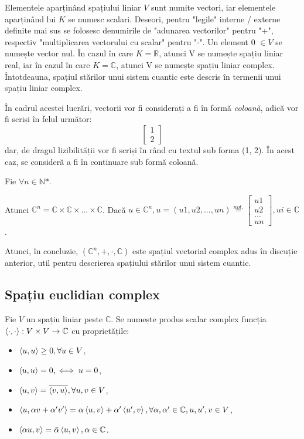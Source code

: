Elementele aparținând spațiului liniar $V$ sunt numite vectori, iar elementele aparținând lui $K$ se numesc scalari. Deseori, pentru "legile" interne / externe definite mai sus se folosesc denumirile de "adunarea vectorilor" pentru "+", respectiv "multiplicarea vectorului cu scalar" pentru "$\cdot$". Un element 0 $\in V$ se numește vector nul. În cazul în care $K = \mathbb{R}$, atunci V se numește spațiu liniar real, iar în cazul în care $K = \mathbb{C}$, atunci V se numește spațiu liniar complex. 
Întotdeauna, spațiul stărilor unui sistem cuantic este descris în termenii unui spațiu liniar complex.

În cadrul acestei lucrări, vectorii vor fi considerați a fi în formă \textit{coloană}, adică vor fi scriși în felul următor:
\[
\begin{bmatrix}
1 \\ 2
\end{bmatrix}
\]
dar, de dragul lizibilității vor fi scriși în rând cu textul sub forma (1, 2). În acest caz, se consideră a fi în continuare sub formă coloană.

Fie $\forall n \in \mathbb{N}\text{*}$.

Atunci $\mathbb{C}^n = \mathbb{C} \times \mathbb{C} \times ... \times \mathbb{C}$. Dacă $u \in \mathbb{C}^n, u=(u1, u2, ..., un) \overset{not.}{=} \begin{bmatrix}
u1 \\ u2 \\ ... \\ un
\end{bmatrix}, ui \in \mathbb{C}$.

Atunci, în concluzie, $(\mathbb{C}^n, +, \cdot, \mathbb{C})$ este spațiul vectorial complex adus în discuție anterior, util pentru descrierea spațiului stărilor unui sistem cuantic.

\subsection{Spațiu euclidian complex}

Fie $V$ un spațiu liniar peste $\mathbb{C}$. Se numește produs scalar complex funcția $\braket{\cdot, \cdot}: V \times V \rightarrow \mathbb{C}$ cu proprietățile:
\begin{itemize}
    \item $\braket{u,u} \geq 0, \forall u \in V$,
    \item $\braket{u,u} = 0, \iff u = 0$,
    \item $\braket{u,v} = \overline{\braket{v, u}}, \forall u, v \in V$,
    \item $\braket{u, \alpha v + \alpha ' v '} = \alpha \braket{u, v} + \alpha ' \braket{u ', v}, \forall \alpha, \alpha ' \in \mathbb{C}, u, u ' , v \in V$,
    \item $\braket{\alpha u, v} = \bar{\alpha} \braket{u, v}, \alpha \in \mathbb{C}$.
\end{itemize}

